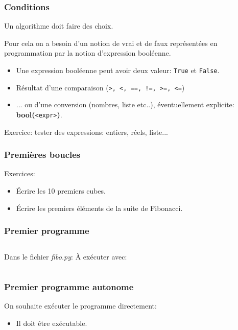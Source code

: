 \documentclass{beamer}
\begin{document}
\begin{frame}[fragile]\frametitle{Conditions}
  Un algorithme doit faire des choix.
  
  

  Pour cela on a besoin d'un notion de vrai et de faux représentées en programmation par la notion d'expression booléenne.
  \begin{itemize}
    \item Une expression booléenne peut avoir deux valeur: \verb|True| et \verb|False|.
    \item Résultat d'une comparaison (\verb|>, <, ==, !=, >=, <=|)
    \item ... ou d'une conversion (nombres, liste etc..), éventuellement explicite: {\bf bool(}\verb|<expr>|{\bf{)}}.
  \end{itemize}
  Exercice: tester des expressions: entiers, réels, liste...
\end{frame}

\begin{frame}[fragile]\frametitle{Premières boucles}
  \center{\fbox{}}
  
  Exercices:
  \begin{itemize}
  \item Écrire les 10 premiers cubes.
  \item Écrire les premiers éléments de la suite de Fibonacci.
  \end{itemize}
\end{frame}

\begin{frame}[fragile]\frametitle{Premier programme}
  \begin{columns}
    Dans le fichier {\it fibo.py}:\newline
    \fbox{}
    À exécuter avec:
    \fbox{}
  \end{columns}
\end{frame}

\begin{frame}[fragile]\frametitle{Premier programme autonome}
  On souhaite exécuter le programme directement:
  \begin{itemize}
  \item Il doit être exécutable.
  \end{itemize}
  \fbox{}
\end{frame}
\end{document}
